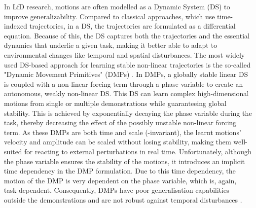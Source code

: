 In LfD research, motions are often modelled as a Dynamic System (DS) \cite{khansari-zadehLearningStableNonlinear2011} to improve generalizability. Compared to classical approaches, which use time-indexed trajectories, in a DS, the trajectories are formulated as a differential equation. Because of this, the DS captures both the trajectories and the essential dynamics that underlie a given task, making it better able to adapt to environmental changes like temporal and spatial disturbances. The most widely used DS-based approach for learning stable non-linear trajectories is the so-called "Dynamic Movement Primitives" (DMPs) \cite{ijspeertDynamicalMovementPrimitives2013,saverianoDynamicMovementPrimitives2021,wangLearningDemonstrationUsing2021,sidiropoulosReversibleDynamicMovement2021,ginesiOvercomingDrawbacksDynamic2021,rozanecNeuralDynamicMovement2022,liProDMPsUnifiedPerspective2022}. In DMPs, a globally stable linear DS is coupled with a non-linear forcing term through a phase variable to create an autonomous, weakly non-linear DS. This DS can learn complex high-dimensional motions from single \cite{ijspeertDynamicalMovementPrimitives2013,prakashDynamicTrajectoryGeneration2020} or multiple demonstrations \cite{matsubaraLearningParametricDynamic2011,pervezLearningTaskparameterizedDynamic2018} while guaranteeing global stability. This is achieved by exponentially decaying the phase variable during the task, thereby decreasing the effect of the possibly unstable non-linear forcing term. As these DMPs are both time and scale (-invariant), the learnt motions' velocity and amplitude can be scaled without losing stability, making them well-suited for reacting to external perturbations in real time. Unfortunately, although the phase variable ensures the stability of the motions, it introduces an implicit time dependency in the DMP formulation. Due to this time dependency, the motion of the DMP is very dependent on the phase variable, which is, again, task-dependent. Consequently, DMPs have poor generalisation capabilities outside the demonstrations and are not robust against temporal disturbances \cite{neumannLearningRobotMotions2015}.


